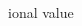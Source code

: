 \documentclass[a4paper]{article}
\begin{document}
\begin{multicols*}{2}
\begin{footnotesize}
ional value \
\end{footnotesize}
\end{multicols*}
\end{document}
